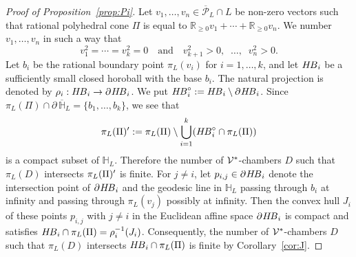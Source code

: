 \documentclass{amsart}
\theoremstyle{plain}
\theoremstyle{definition}
\theoremstyle{remark}
\numberwithin{equation}{section}
\numberwithin{table}{section}
\numberwithin{figure}{section}
\renewcommand{\H}{\mathord{\mathbb H}}
\newcommand{\R}{\mathord{\mathbb R}}
\newcommand{\PPP}{\mathord{\mathcal P}}
\newcommand{\VVV}{\mathord{\mathcal V}}
\newcommand{\inv}{\sp{-1}}
\newcommand{\sprime}{\sp\prime}
\newcommand{\spcirc}{\sp{\mathord{\circ}}}
\newcommand{\bdr}{\partial\,}
\newcommand{\rmand}{\textrm{and}}
\newcommand{\quand}{\quad\rmand\quad}
\newcommand{\sphyp}{\sp*}
\newcommand{\clPPP}{\overline{\PPP}}
\newcommand{\clH}{\overline{\H}}
\newcommand{\HB}{\mathord{H\hskip -1pt B}}
\newcommand{\bdrHB}{\mathord{\bdr \hskip -1.2pt H\hskip -1.2pt B}}
\begin{document}
\begin{proof}[Proof of Proposition~\ref{prop:Pi}]
Let $v_1, \dots, v_n\in \clPPP_L\cap L$ be non-zero vectors
such that rational polyhedral cone $\Pi$ is equal to $\R_{\ge 0} v_1+ \cdots+ \R_{\ge 0} v_n$.
We number $v_1, \dots, v_n$ in such a way that 
$$
v_1^2=\cdots=v_k^2=0
\quand
v_{k+1}^2>0, \;\; \dots, \;\;  v_{n}^2>0.
$$
Let $b_i$ be the rational boundary point $\pi_L(v_i)$ for $i=1, \dots, k$,
and let $\HB_i$ be a sufficiently small closed horoball with the base $b_i$.
The natural projection is denoted by $\rho_i :\HB_i\to \bdrHB_i$.
We put  $\HB_i\spcirc :=\HB_i\setminus \bdrHB_i$.
Since $\pi_L(\Pi)\cap\bdr\clH_L=\{b_1, \dots, b_k\}$,
we see that 
$$
\pi_L(\Pi)\sprime:=\pi_L(\Pi)\setminus\bigcup_{i=1}^k (\HB_i\spcirc \cap \pi_L(\Pi))
$$
is a compact subset of $\H_L$.
Therefore the number of $\VVV\sphyp$-chambers $D$
such that $\pi_L(D)$ intersects $\pi_L(\Pi)\sprime$ is finite.
For $j\ne i$,
let $p_{i, j}\in \bdrHB_i$ denote  the intersection point 
of $\bdrHB_i$ and the geodesic line in $\H_L$ passing through $b_i$ at infinity and 
passing through $\pi_L(v_j)$ possibly at infinity.
Then the convex hull $J_i$ of these points $p_{i, j}$ with $j\ne i$
in the Euclidean affine space $\bdrHB_i$ is compact and satisfies
$\HB_i \cap \pi_L(\Pi)=\rho_i\inv (J_i)$.
Consequently,  the number of $\VVV\sphyp$-chambers $D$
such that $\pi_L(D)$ intersects $\HB_i \cap \pi_L(\Pi)$
is finite by Corollary~\ref{cor:J}.
\end{proof}
%
%
\end{document}
